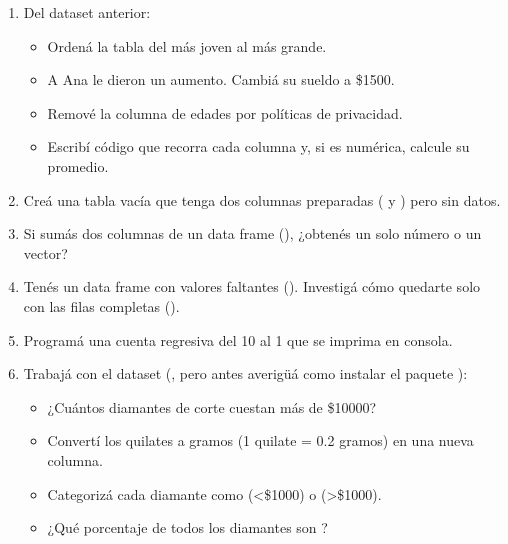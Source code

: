 \documentclass[8pt]{beamer}
\begin{document}
\begin{frame}[fragile]
\begin{enumerate}[start=12]
	\item Del dataset  anterior:
	\begin{itemize}
		\item Ordená la tabla del más joven al más grande.
		\item A Ana le dieron un aumento. Cambiá su sueldo a \$1500.
		\item Remové la columna de edades por políticas de privacidad.
		\item Escribí código que recorra cada columna y, si es numérica, calcule su promedio.
	\end{itemize}
	\item Creá una tabla vacía que tenga dos columnas preparadas (  y  ) pero sin datos.
	
	\item Si sumás dos columnas de un data frame (), ¿obtenés un solo número o un vector?
	
	\item Tenés un data frame con valores faltantes (). Investigá cómo quedarte solo con las filas completas ().
	
	\item Programá una cuenta regresiva del 10 al 1 que se imprima en consola.
	
	\item  Trabajá con el dataset  (, pero antes averig\"u\'a como instalar el paquete ):
	\begin{itemize}
		\item ¿Cuántos diamantes de corte   cuestan más de \$10000?
		\item Convertí los quilates a gramos (1 quilate = 0.2 gramos) en una nueva columna.
		\item Categorizá cada diamante como   (<\$1000) o   (>\$1000).
		\item ¿Qué porcentaje de todos los diamantes son  ?
	\end{itemize}
\end{enumerate}
\end{frame}
\end{document}
